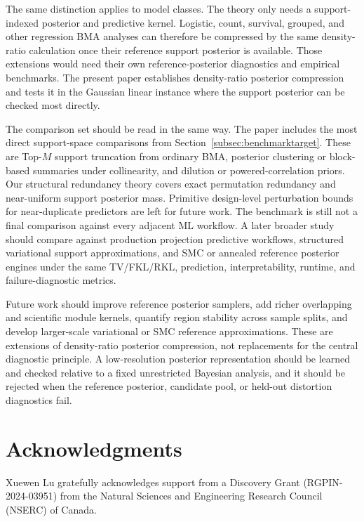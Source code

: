 \documentclass[twoside,11pt]{article}
\begin{document}
The same distinction applies to model classes. The theory only needs a support-indexed posterior and predictive kernel. Logistic, count, survival, grouped, and other regression BMA analyses can therefore be compressed by the same density-ratio calculation once their reference support posterior is available. Those extensions would need their own reference-posterior diagnostics and empirical benchmarks. The present paper establishes density-ratio posterior compression and tests it in the Gaussian linear instance where the support posterior can be checked most directly.

The comparison set should be read in the same way. The paper includes the most direct support-space comparisons from Section~\ref{subsec:benchmarktarget}. These are Top-\(M\) support truncation from ordinary BMA, posterior clustering or block-based summaries under collinearity, and dilution or powered-correlation priors. Our structural redundancy theory covers exact permutation redundancy and near-uniform support posterior mass. Primitive design-level perturbation bounds for near-duplicate predictors are left for future work. The benchmark is still not a final comparison against every adjacent ML workflow. A later broader study should compare against production projection predictive workflows, structured variational support approximations, and SMC or annealed reference posterior engines under the same TV/FKL/RKL, prediction, interpretability, runtime, and failure-diagnostic metrics.

Future work should improve reference posterior samplers, add richer overlapping and scientific module kernels, quantify region stability across sample splits, and develop larger-scale variational or SMC reference approximations. These are extensions of density-ratio posterior compression, not replacements for the central diagnostic principle. A low-resolution posterior representation should be learned and checked relative to a fixed unrestricted Bayesian analysis, and it should be rejected when the reference posterior, candidate pool, or held-out distortion diagnostics fail.

\section*{Acknowledgments}

Xuewen Lu gratefully acknowledges support from a Discovery Grant (RGPIN-2024-03951) from the Natural Sciences and Engineering Research Council (NSERC) of Canada.
\end{document}
